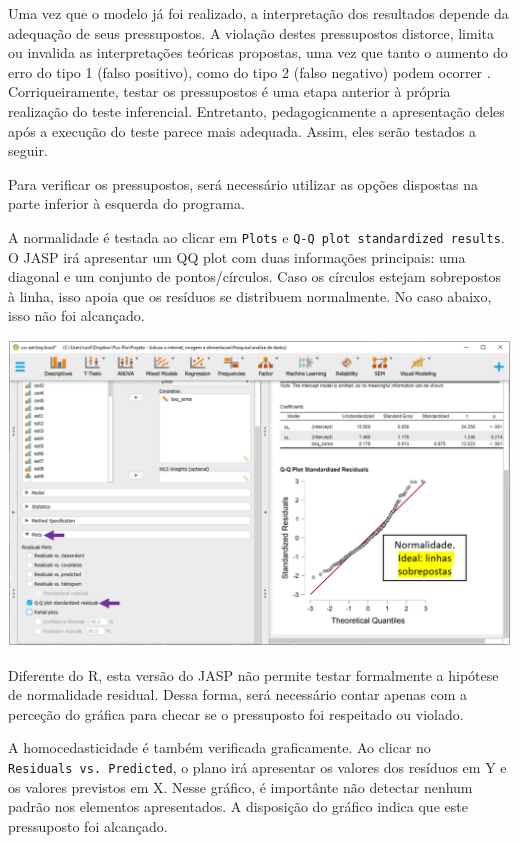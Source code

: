 \documentclass[
]{book}
\begin{document}
Uma vez que o modelo já foi realizado, a interpretação dos resultados depende da adequação de seus pressupostos. A violação destes pressupostos distorce, limita ou invalida as interpretações teóricas propostas, uma vez que tanto o aumento do erro do tipo 1 (falso positivo), como do tipo 2 (falso negativo) podem ocorrer \citep{Lix1996, Barker2015, Ernst2017}. Corriqueiramente, testar os pressupostos é uma etapa anterior à própria realização do teste inferencial. Entretanto, pedagogicamente a apresentação deles após a execução do teste parece mais adequada. Assim, eles serão testados a seguir.

Para verificar os pressupostos, será necessário utilizar as opções dispostas na parte inferior à esquerda do programa.

A normalidade é testada ao clicar em \texttt{Plots} e \texttt{Q-Q\ plot\ standardized\ results}. O JASP irá apresentar um QQ plot com duas informações principais: uma diagonal e um conjunto de pontos/círculos. Caso os círculos estejam sobrepostos à linha, isso apoia que os resíduos se distribuem normalmente. No caso abaixo, isso não foi alcançado.

\includegraphics{./img/cap_reg_normalidade.png}

Diferente do R, esta versão do JASP não permite testar formalmente a hipótese de normalidade residual. Dessa forma, será necessário contar apenas com a perceção do gráfica para checar se o pressuposto foi respeitado ou violado.

A homocedasticidade é também verificada graficamente. Ao clicar no \texttt{Residuals\ vs.\ Predicted}, o plano irá apresentar os valores dos resíduos em Y e os valores previstos em X. Nesse gráfico, é importânte não detectar nenhum padrão nos elementos apresentados. A disposição do gráfico indica que este pressuposto foi alcançado.
\end{document}

